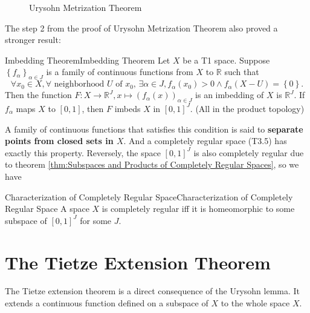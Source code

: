 \documentclass[../main.tex]{subfiles}
\begin{document}
\begin{figure}[ht]
    \centering
    \caption{Urysohn Metrization Theorem}
    \label{fig:urysohn-metrization-theorem}
\end{figure}

The step 2 from the proof of Urysohn Metrization Theorem also proved a stronger result:

\begin{theorem}{Imbedding Theorem}{Imbedding Theorem}
	Let $X$ be a T1 space. Suppose $\left\{ f_{\alpha} \right\}_{\alpha\in J}$ is a family of continuous functions from $X$ to $\mathbb{R}$ such that
	\begin{equation*}
	\forall x_0\in X, \forall \text{ neighborhood $U$ of $x_0$, } \exists \alpha\in J, f_{\alpha}(x_0)>0\land f_{\alpha}(X-U) = \left\{ 0 \right\}.
	\end{equation*}
	Then the function $F: X \rightarrow \mathbb{R}^{J}, x \mapsto (f_{\alpha}(x))_{\alpha\in J}$ is an imbedding of $X$ is $\mathbb{R}^{J}$. If $f_{\alpha}$ maps $X$ to $[0,1]$, then $F$ imbeds $X$ in $[0,1]^{J}$. (All in the product topology)
\end{theorem}

A family of continuous functions that satisfies this condition is said to \textbf{separate points from closed sets in $X$}. And a completely regular space (T3.5) has exactly this property. Reversely, the space $[0,1]^J$ is also completely regular due to theorem \ref{thm:Subspaces and Products of Completely Regular Spaces}, so we have

\begin{theorem}{Characterization of Completely Regular Space}{Characterization of Completely Regular Space}
	A space $X$ is completely regular iff it is homeomorphic to some subspace of $[0,1]^J$ for some $J$.
\end{theorem}

\section{The Tietze Extension Theorem}

The Tietze extension theorem is a direct consequence of the Urysohn lemma. It extends a continuous function defined on a subspace of $X$ to the whole space $X$.
\end{document}
